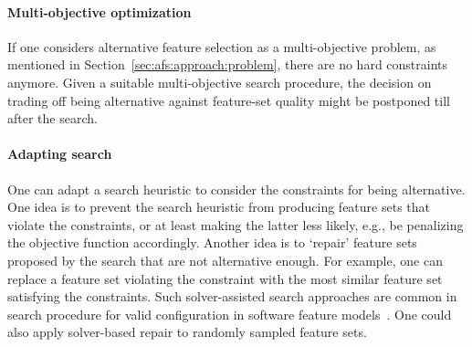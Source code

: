 \documentclass{article}
\theoremstyle{definition}
\begin{document}
\paragraph{Multi-objective optimization}

If one considers alternative feature selection as a multi-objective problem, as mentioned in Section~\ref{sec:afs:approach:problem}, there are no hard constraints anymore.
Given a suitable multi-objective search procedure, the decision on trading off being alternative against feature-set quality might be postponed till after the search.

\paragraph{Adapting search}

One can adapt a search heuristic to consider the constraints for being alternative.
One idea is to prevent the search heuristic from producing feature sets that violate the constraints, or at least making the latter less likely, e.g., be penalizing the objective function accordingly.
Another idea is to `repair' feature sets proposed by the search that are not alternative enough.
For example, one can replace a feature set violating the constraint with the most similar feature set satisfying the constraints.
Such solver-assisted search approaches are common in search procedure for valid configuration in software feature models~\cite{guo2018preserve, henard2015combining, white2010automated}.
One could also apply solver-based repair to randomly sampled feature sets.
\end{document}
